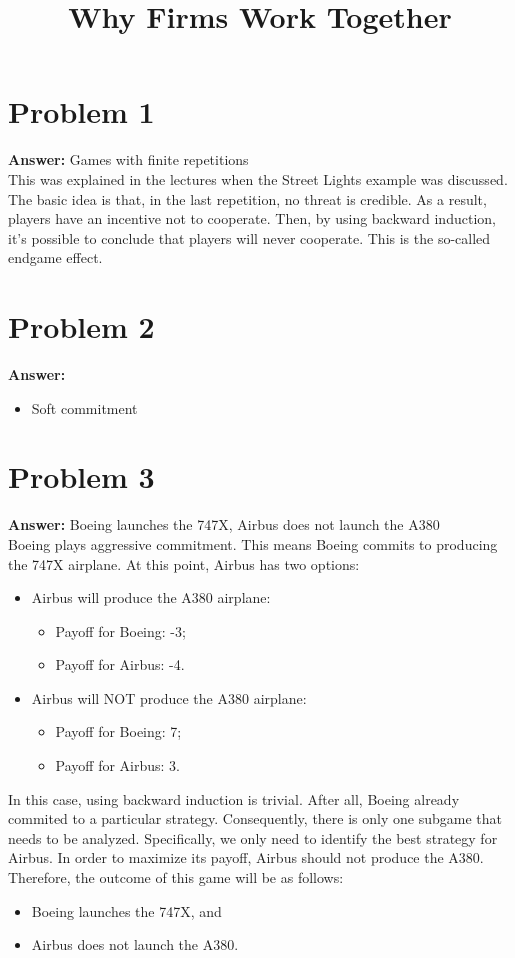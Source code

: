 \documentclass[11pt]{article}
\date{}
\title{Why Firms Work Together}
\begin{document}
\thispagestyle{empty}
\pagestyle{empty}
\section*{Problem 1}
\label{sec:orged8b7a8}

\textbf{Answer:} Games with finite repetitions\\

This was explained in the lectures when the Street Lights example was discussed.
The basic idea is that, in the last repetition, no threat is credible. As a
result, players have an incentive not to cooperate. Then, by using backward
induction, it's possible to conclude that players will never cooperate. This is
the so-called endgame effect.
\section*{Problem 2}
\label{sec:orgd0aaf3c}

\textbf{Answer:}
\begin{itemize}
\item Soft commitment
\end{itemize}
\section*{Problem 3}
\label{sec:orgf7f6e06}

\textbf{Answer:} Boeing launches the 747X, Airbus does not launch the A380\\

Boeing plays aggressive commitment. This means Boeing commits to producing the
747X airplane. At this point, Airbus has two options:
\begin{itemize}
\item Airbus will produce the A380 airplane:
\begin{itemize}
\item Payoff for Boeing: -3;
\item Payoff for Airbus: -4.
\end{itemize}
\item Airbus will NOT produce the A380 airplane:
\begin{itemize}
\item Payoff for Boeing: 7;
\item Payoff for Airbus: 3.
\end{itemize}
\end{itemize}
In this case, using backward induction is trivial. After all, Boeing already
commited to a particular strategy. Consequently, there is only one subgame that
needs to be analyzed. Specifically, we only need to identify the best strategy
for Airbus. In order to maximize its payoff, Airbus should not produce the A380.
Therefore, the outcome of this game will be as follows:
\begin{itemize}
\item Boeing launches the 747X, and
\item Airbus does not launch the A380.
\end{itemize}
\end{document}
